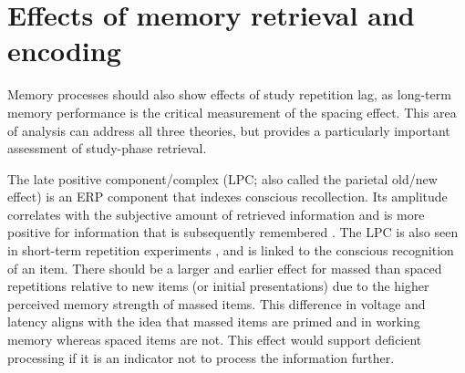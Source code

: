 
\section{Effects of memory retrieval and encoding}

Memory processes should also show effects of study repetition lag, as long-term memory performance is the critical measurement of the spacing effect.  This area of analysis
can address all three theories, but provides a particularly important assessment of study-phase retrieval.



The late positive component/complex (LPC; also called the parietal old/new effect) is an ERP component that indexes conscious recollection.  Its amplitude correlates with the subjective amount of retrieved information \cite{VilbEtal2006,Wild2000,WildRugg1996} and is more positive for information that is subsequently remembered \cite{RuggEtal2002,WagnEtal1999}.
The LPC is also seen in short-term repetition experiments \cite{OlicEtal2000,VanSEtal2007},
and is linked to the conscious recognition of an item.
There should be a larger and earlier effect for massed than spaced repetitions relative to new items (or initial presentations) due to the higher perceived memory strength of massed items.  This difference in voltage and latency aligns with the idea that massed items are primed and in working memory whereas spaced items are not.  This effect would support deficient processing if it is an indicator not to process the information further.


